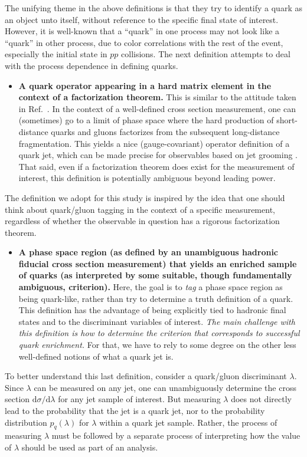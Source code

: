 \documentclass[11pt,letterpaper]{article}
\DeclareRobustCommand{\Ref}[1]{Ref.~\cite{#1}}
\begin{document}
The unifying theme in the above definitions is that they try to identify a quark as an object unto itself, without reference to the specific final state of interest.  However, it is well-known that a ``quark'' in one process may not look like a ``quark'' in other process, due to color correlations with the rest of the event, especially the initial state in $pp$ collisions.  The next definition attempts to deal with the process dependence in defining quarks. 
\begin{itemize}
\item \textbf{A quark operator appearing in a hard matrix element in the context of a factorization theorem.}  This is similar to the attitude taken in \Ref{Gallicchio:2011xc}.  In the context of a well-defined cross section measurement, one can (sometimes) go to a limit of phase space where the hard production of short-distance quarks and gluons factorizes from the subsequent long-distance fragmentation.  This yields a nice (gauge-covariant) operator definition of a quark jet, which can be made precise for observables based on jet grooming \cite{Frye:2016okc,Frye:2016aiz}.  That said, even if a factorization theorem does exist for the measurement of interest, this definition is potentially ambiguous beyond leading power.
\end{itemize}
The definition we adopt for this study is inspired by the idea that one should think about quark/gluon tagging in the context of a specific measurement, regardless of whether the observable in question has a rigorous factorization theorem.
\begin{itemize}
\item \textbf{A phase space region (as defined by an unambiguous
    hadronic fiducial cross section measurement) that yields an
    enriched sample of quarks (as interpreted by some suitable, though
    fundamentally ambiguous, criterion).}  Here, the goal is to
  \emph{tag} a phase space region as being quark-like, rather than try
  to determine a truth definition of a quark.  This definition has the
  advantage of being explicitly tied to hadronic final states and to
  the discriminant variables of interest. \emph{The main
  challenge with this definition is how to determine the criterion
  that corresponds to successful quark enrichment.}  For that, we
  have to rely to some degree on the other less well-defined notions
  of what a quark jet is.
\end{itemize}

To better understand this last definition, consider a quark/gluon discriminant $\lambda$.  Since $\lambda$ can be measured on any jet, one can unambiguously determine the cross section $\text{d} \sigma / \text{d} \lambda$ for any jet sample of interest.  But measuring $\lambda$ does not directly lead to the probability that the jet is a quark jet, nor to the probability distribution  $p_q(\lambda)$ for $\lambda$ within a quark jet sample.  Rather, the process of measuring $\lambda$ must be followed by a separate process of interpreting how the value of $\lambda$ should be used as part of an analysis.
\end{document}
